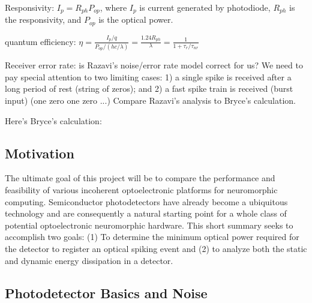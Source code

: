 \documentclass[onecolumn]{article}
\begin{document}
\vspace{2em}
\noindent Responsivity: $I_p = R_{ph}P_{op}$, where $I_p$ is current generated by photodiode, $R_{ph}$ is the responsivity, and $P_{op}$ is the optical power.

\vspace{2em}
\noindent quantum efficiency: $\eta = \frac{I_p/q}{P_{op}/(hc/\lambda)} = \frac{1.24R_{ph}}{\lambda} = \frac{1}{1+\tau_{r}/\tau_{nr}}$

\vspace{2em}
\noindent Receiver error rate: is Razavi's noise/error rate model correct for us? We need to pay special attention to two limiting cases: 1) a single spike is received after a long period of rest (string of zeros); and 2) a fast spike train is received (burst input) (one zero one zero ...) Compare Razavi's analysis to Bryce's calculation. 

Here's Bryce's calculation:

\subsection{Motivation}
The ultimate goal of this project will be to compare the performance and feasibility of various incoherent optoelectronic platforms for neuromorphic computing. Semiconductor photodetectors have already become a ubiquitous technology and are consequently a natural starting point for a whole class of potential optoelectronic neuromorphic hardware. This short summary seeks to accomplish two goals: (1) To determine the minimum optical power required for the detector to register an optical spiking event and (2) to analyze both the static and dynamic energy dissipation in a detector.

\subsection{Photodetector Basics and Noise}
\end{document}
